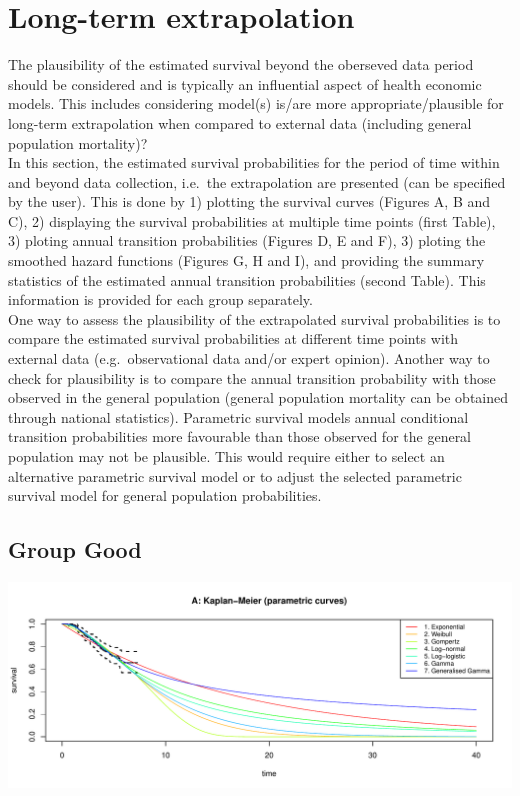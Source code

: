 \documentclass[]{article}
\begin{document}
\section{Long-term extrapolation}\label{long-term-extrapolation}

The plausibility of the estimated survival beyond the oberseved data
period should be considered and is typically an influential aspect of
health economic models. This includes considering model(s) is/are more
appropriate/plausible for long-term extrapolation when compared to
external data (including general population mortality)?\\
In this section, the estimated survival probabilities for the period of
time within and beyond data collection, i.e.~the extrapolation are
presented (can be specified by the user). This is done by 1) plotting
the survival curves (Figures A, B and C), 2) displaying the survival
probabilities at multiple time points (first Table), 3) ploting annual
transition probabilities (Figures D, E and F), 3) ploting the smoothed
hazard functions (Figures G, H and I), and providing the summary
statistics of the estimated annual transition probabilities (second
Table). This information is provided for each group separately.\\
One way to assess the plausibility of the extrapolated survival
probabilities is to compare the estimated survival probabilities at
different time points with external data (e.g.~observational data and/or
expert opinion). Another way to check for plausibility is to compare the
annual transition probability with those observed in the general
population (general population mortality can be obtained through
national statistics). Parametric survival models annual conditional
transition probabilities more favourable than those observed for the
general population may not be plausible. This would require either to
select an alternative parametric survival model or to adjust the
selected parametric survival model for general population probabilities.

\newpage

\subsection{Group Good}\label{group-good}

\begin{flushleft}\includegraphics[height=0.29\textheight]{Images/validate_extrapolation1-1} \end{flushleft}
\end{document}
